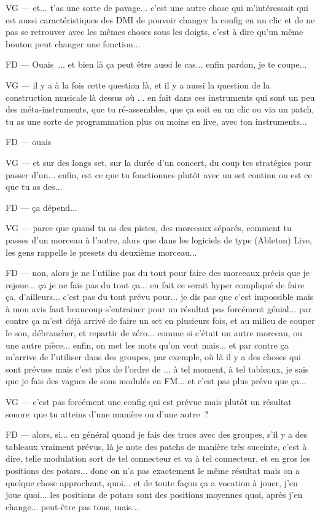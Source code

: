 VG — et... t'as une sorte de pavage... c'est une autre chose qui m'intéressait qui est aussi caractéristiques des DMI de pouvoir changer la config en un clic et de ne pas se retrouver avec les mêmes choses sous les doigts, c'est à dire qu'un même bouton peut changer une fonction... 

FD — Ouais ... et bien là ça peut être aussi le cas... enfin pardon, je te coupe... 

VG — il y a à la fois cette question là, et il y a aussi la question de la construction musicale là dessus où ... en fait dans ces instruments qui sont un peu des méta-instruments, que tu ré-assembles, que ça soit en un clic ou via un patch, tu as une sorte de programmation plus ou moins en live, avec ton instruments... 

FD — ouais 

VG — et sur des longs set, sur la durée d'un concert, du coup tes stratégies pour passer d'un... enfin, est ce que tu fonctionnes plutôt avec un set continu ou est ce que tu as des... 

FD — ça dépend... 

VG — parce que quand tu as des pistes, des morceaux séparés, comment tu passes d'un morceau à l'autre, alors que dans les logiciels de type (Ableton) Live, les gens rappelle le presets du deuxième morceau... 

FD — non, alors je ne l'utilise pas du tout pour faire des morceaux précis que je rejoue... ça je ne fais pas du tout ça... en fait ce serait hyper compliqué de faire ça, d'ailleurs... c'est pas du tout prévu pour... je dis pas que c'est impossible mais à mon avis faut beaucoup s'entrainer pour un résultat pas forcément génial... par contre ça m'est déjà arrivé de faire un set en plusieurs fois, et au milieu de couper le son, débrancher, et repartir de zéro... comme si c'était un autre morceau, ou une autre pièce... enfin, on met les mots qu'on veut mais... et par contre ça m'arrive de l'utiliser dans des groupes, par exemple, où là il y a des choses qui sont prévues mais c'est plus de l'ordre de ... à tel moment, à tel tableaux, je sais que je fais des vagues de sons modulés en FM... et c'est pas plus prévu que ça... 

VG — c'est pas forcément une config qui est prévue mais plutôt un résultat sonore que tu atteins d'une manière ou d'une autre ? 

FD — alors, si... en général quand je fais des trucs avec des groupes, s'il y a des tableaux vraiment prévus, là je note des patchs de manière très succinte, c'est à dire, telle modulation sort de tel connecteur et va à tel connecteur, et en gros les positions des potars... donc on n'a pas exactement le même résultat mais on a quelque chose approchant, quoi... et de toute façon ça a vocation à jouer, j'en joue quoi... les positions de potars sont des positions moyennes quoi, après j'en change... peut-être pas tous, mais... 

